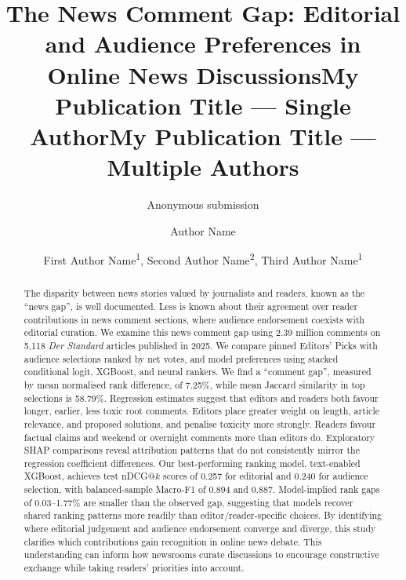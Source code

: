 \documentclass[letterpaper]{article} %
\title{The News Comment Gap: Editorial and Audience Preferences in Online News Discussions}
\author{Anonymous submission
}
\title{My Publication Title --- Single Author}
\author {
    Author Name
}
\title{My Publication Title --- Multiple Authors}
\author {
    First Author Name\textsuperscript{\rm 1},
    Second Author Name\textsuperscript{\rm 2},
    Third Author Name\textsuperscript{\rm 1}
}
\begin{document}
\maketitle

\begin{abstract}
The disparity between news stories valued by journalists and readers, known as the ``news gap'', is well documented. Less is known about their agreement over reader contributions in news comment sections, where audience endorsement coexists with editorial curation. We examine this news comment gap using 2.39 million comments on 5,118 \textit{Der Standard} articles published in 2025. We compare pinned Editors' Picks with audience selections ranked by net votes, and model preferences using stacked conditional logit, XGBoost, and neural rankers. We find a ``comment gap'', measured by mean normalised rank difference, of 7.25\%, while mean Jaccard similarity in top selections is 58.79\%. Regression estimates suggest that editors and readers both favour longer, earlier, less toxic root comments. Editors place greater weight on length, article relevance, and proposed solutions, and penalise toxicity more strongly. Readers favour factual claims and weekend or overnight comments more than editors do. Exploratory SHAP comparisons reveal attribution patterns that do not consistently mirror the regression coefficient differences. Our best-performing ranking model, text-enabled XGBoost, achieves test nDCG@$k$ scores of 0.257 for editorial and 0.240 for audience selection, with balanced-sample Macro-F1 of 0.894 and 0.887. Model-implied rank gaps of 0.03--1.77\% are smaller than the observed gap, suggesting that models recover shared ranking patterns more readily than editor/reader-specific choices. By identifying where editorial judgement and audience endorsement converge and diverge, this study clarifies which contributions gain recognition in online news debate. This understanding can inform how newsrooms curate discussions to encourage constructive exchange while taking readers' priorities into account.
\end{abstract}

\begin{links}
\end{links}



\clearpage

\clearpage
\appendix

\end{document}
